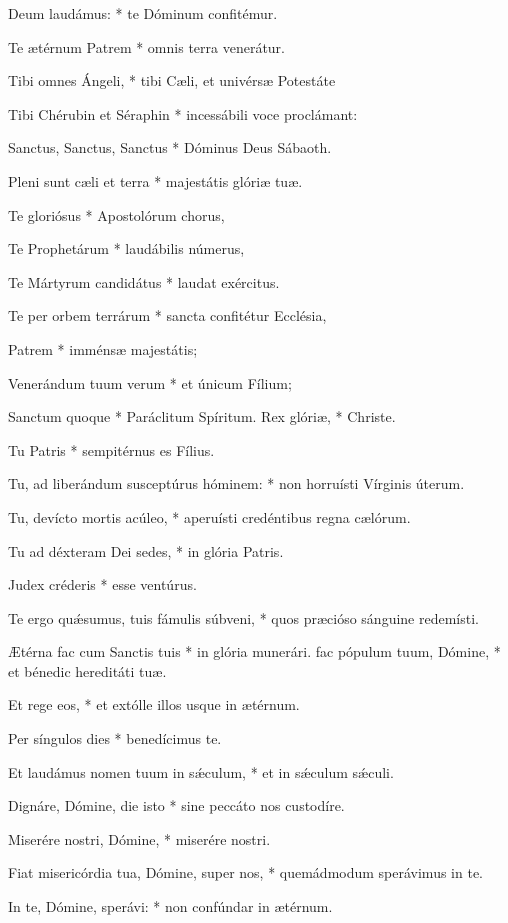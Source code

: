 {
 Deum laudámus: * te Dóminum confitémur.\par
Te {\ae}térnum Patrem * omnis terra venerátur.\par
Tibi omnes Ángeli, * tibi C{\ae}li, et univérs{\ae} Potestáte\par
Tibi Chérubin et Séraphin * incessábili voce proclámant:\par
Sanctus, Sanctus, Sanctus * Dóminus Deus Sábaoth.\par
Pleni sunt c{\ae}li et terra * majestátis glóri{\ae} tu{\ae}.\par
Te gloriósus * Apostolórum chorus,\par
Te Prophetárum * laudábilis númerus,\par
Te Mártyrum candidátus * laudat exércitus.\par
Te per orbem terrárum * sancta confitétur Ecclésia,\par
Patrem * imméns{\ae} majestátis;\par
Venerándum tuum verum * et únicum Fílium;\par
Sanctum quoque * Paráclitum Spíritum.
 Rex glóri{\ae}, * Christe.\par
Tu Patris * sempitérnus es Fílius.\par
Tu, ad liberándum susceptúrus hóminem: * non horruísti Vírginis úterum.\par
Tu, devícto mortis acúleo, * aperuísti credéntibus regna c{\ae}lórum.\par
Tu ad déxteram Dei sedes, * in glória Patris.\par
Judex créderis * esse ventúrus. \par
Te ergo quǽsumus, tuis fámulis súbveni, * quos pr{\ae}cióso sánguine redemísti.\par
{\AE}térna fac cum Sanctis tuis * in glória munerári.
 fac pópulum tuum, Dómine, * et bénedic hereditáti tu{\ae}.\par
Et rege eos, * et extólle illos usque in {\ae}térnum.\par
Per síngulos dies * benedícimus te.\par
Et laudámus nomen tuum in sǽculum, * et in sǽculum sǽculi.\par
Dignáre, Dómine, die isto * sine peccáto nos custodíre.\par
Miserére nostri, Dómine, * miserére nostri.\par
Fiat misericórdia tua, Dómine, super nos, * quemádmodum sperávimus in te.\par
In te, Dómine, sperávi: * non confúndar in {\ae}térnum.
}

